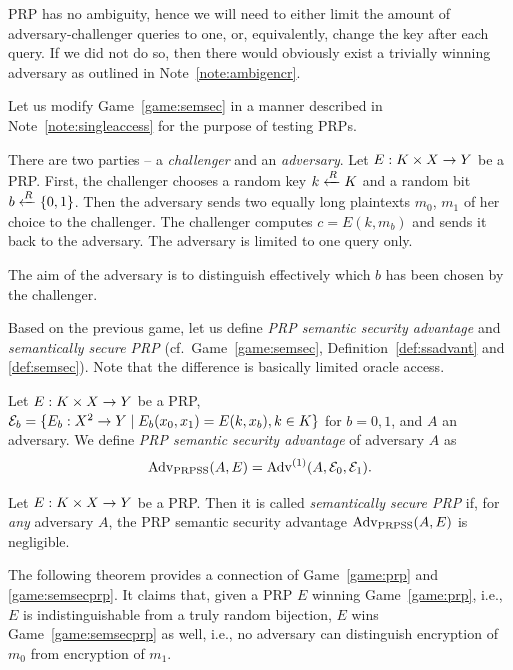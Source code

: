 \begin{note}   %
\label{note:singleaccess}
	PRP has no ambiguity, hence we will need to either limit the amount of adversary-challenger queries to one, or, equivalently, change the key after each query. If we did not do so, then there would obviously exist a trivially winning adversary as outlined in Note~\ref{note:ambigencr}.
\end{note}

Let us modify Game~\ref{game:semsec} in a manner described in Note~\ref{note:singleaccess} for the purpose of testing PRPs.

\begin{game}
\label{game:semsecprp}
	There are two parties -- a {\em challenger} and an {\em adversary}. Let $E:K\times X\rightarrow Y$ be a PRP. First, the challenger chooses a random key $k\xleftarrow{R} K$ and a random bit $b\xleftarrow{R}\{0,1\}$. Then the adversary sends two equally long plaintexts $m_0$, $m_1$ of her choice to the challenger. The challenger computes $c = E(k,m_b)$ and sends it back to the adversary. The adversary is limited to one query only.
	
	The aim of the adversary is to distinguish effectively which $b$ has been chosen by the challenger.
\end{game}

Based on the previous game, let us define {\em PRP semantic security advantage} and {\em semantically secure PRP} (cf.\ Game~\ref{game:semsec}, Definition~\ref{def:ssadvant} and \ref{def:semsec}). Note that the difference is basically limited oracle access.

\begin{defn}
\label{def:prpssadvant}
	Let $E: K\times X\rightarrow Y$ be a PRP, ${\cal E}_b = \{E_b:X^2\rightarrow Y \mid E_b(x_0,x_1) = E(k,x_b), k\in K\}$ for $b=0,1$, and $A$ an adversary. We define {\em PRP semantic security advantage} of adversary $A$ as
	\[
		\operatorname*{Adv_{PRPSS}}(A,E) = {\operatorname*{Adv}}^{(1)}(A,{\cal E}_0,{\cal E}_1) .
	\]
\end{defn}

\begin{defn}
\label{def:semsecprp}
	Let $E: K\times X\rightarrow Y$ be a PRP. Then it is called {\em semantically secure PRP} if, for {\em any} adversary $A$, the PRP semantic security advantage $\operatorname*{Adv_{PRPSS}}(A,E)$ is negligible.
\end{defn}

The following theorem provides a connection of Game~\ref{game:prp} and \ref{game:semsecprp}. It claims that, given a PRP $E$ winning Game~\ref{game:prp}, i.e., $E$ is indistinguishable from a truly random bijection, $E$ wins Game~\ref{game:semsecprp} as well, i.e., no adversary can distinguish encryption of $m_0$ from encryption of $m_1$.


